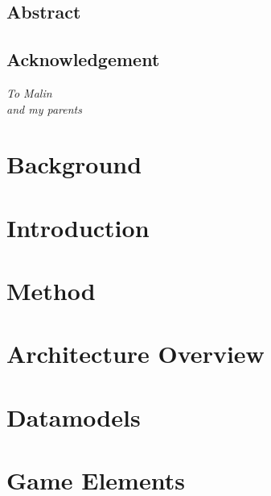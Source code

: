 \documentclass[a4paper,12pt,oneside]{book}
\begin{document}
\frontmatter


\newpage
\section*{Abstract}

\newpage
\section*{Acknowledgement}

\newpage
\begin{flushright}
	\null{}
	\itshape
	To Malin \\
	and my parents
	\null
\end{flushright}

\tableofcontents
\listoffigures
\listoftables
\mainmatter


\chapter{Background}


\chapter{Introduction}



\chapter{Method}


\chapter{Architecture Overview}


\chapter{Datamodels}





\chapter{Game Elements}

\end{document}

